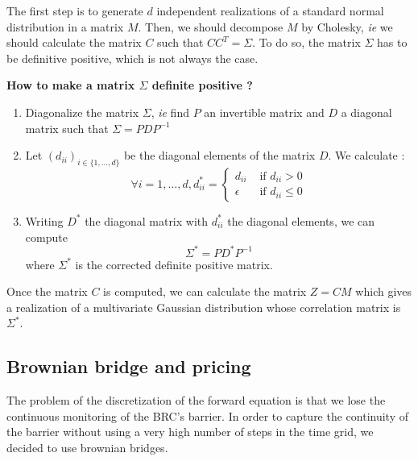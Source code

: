 \documentclass[a4paper,11pt,english]{book}
\begin{document}
The first step is to generate $d$ independent realizations of a standard normal distribution in a matrix $M$. Then, we should decompose $M$ by Cholesky, \textit{ie} we should calculate the matrix $C$ such that $CC^{T}=\Sigma$. To do so, the matrix $\Sigma$ has to be definitive positive, which is not always the case. \\

\begin{tcolorbox}[breakable,colback=cyan,opacityfill=0.05,colframe=blue,width=\dimexpr\textwidth+12mm\relax,enlarge left by=-6mm]
\begin{center}
\vspace{0.2cm}
\textbf{How to make a matrix $\Sigma$ definite positive ?}
\end{center}
\begin{enumerate}
    \item Diagonalize the matrix $\Sigma$, \textit{ie} find $P$ an invertible matrix and $D$ a diagonal matrix such that $\Sigma=PDP^{-1}$
    \item Let $(d_{ii})_{i \in \{1,\ldots,d\}}$ be the diagonal elements of the matrix $D$. We calculate : $$\forall i=1,\ldots,d, d_{ii}^{*}=\begin{cases}
        d_{ii}& \text{ if } d_{ii}>0 \\
        \epsilon& \text{ if } d_{ii}\leq0
    \end{cases}$$
 \item Writing $D^{*}$ the diagonal matrix with $d_{ii}^{*}$ the diagonal elements, we can compute $$\Sigma^{*}=PD^{*}P^{-1}$$ where $\Sigma^{*}$ is the corrected definite positive matrix.
\end{enumerate}
\end{tcolorbox}
Once the matrix $C$ is computed, we can calculate the matrix $Z=CM$ which gives a realization of a multivariate Gaussian distribution whose correlation matrix is $\Sigma^*$.
\subsection{Brownian bridge and pricing}
\label{subsec:brownian-bridge}
The problem of the discretization of the forward equation is that we lose the continuous monitoring of the BRC's barrier. In order to capture the continuity of the barrier without using a very high number of steps in the time grid, we decided to use brownian bridges.\\
\end{document}
